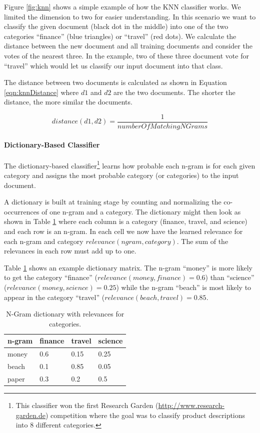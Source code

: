 \documentclass[a4paper,twoside]{book}      %
\begin{document}
Figure \ref{fig:knn} shows a simple example of how the KNN classifier works. We limited the dimension to two for easier understanding. In this scenario we want to classify the given document (black dot in the middle) into one of the two categories ``finance'' (blue triangles) or ``travel'' (red dots). We calculate the distance between the new document and all training documents and consider the votes of the nearest three. In the example, two of these three document vote for ``travel'' which would let us classify our input document into that class.

The distance between two documents is calculated as shown in Equation \ref{eqn:knnDistance} where $d1$ and $d2$ are the two documents. The shorter the distance, the more similar the documents.

\begin{equation}
\label{eqn:knnDistance}
distance(d1,d2) = \frac{1}{numberOfMatchingNGrams}
\end{equation}

\paragraph{Dictionary-Based Classifier}
The dictionary-based classifier\footnote{This classifier won the first Research Garden (\url{http://www.research-garden.de}) competition where the goal was to classify product descriptions into 8 different categories.} learns how probable each n-gram is for each given category and assigns the most probable category (or categories) to the input document.

A dictionary is built at training stage by counting and normalizing the co-occurrences of one n-gram and a category. The dictionary might then look as shown in Table \ref{tab:dictionary} where each column is a category (finance, travel, and science) and each row is an n-gram. In each cell we now have the learned relevance for each n-gram and category $relevance(ngram,category)$. The sum of the relevances in each row must add up to one.

Table \ref{tab:dictionary} shows an example dictionary matrix. The n-gram ``money'' is more likely to get the category ``finance'' ($relevance(money,finance) = 0.6$) than ``science'' ($relevance(money,science) = 0.25$) while the n-gram ``beach'' is most likely to appear in the category ``travel'' ($relevance(beach,travel) = 0.85$.

\begin{table}[ht]
\centering
\caption{N-Gram dictionary with relevances for categories.}
\begin{tabular}{|l|l|l|l|}
\hline
n-gram   & finance & travel & science \\
\hline
money	   & 0.6	&	0.15	&	0.25	\\
\hline
beach	& 0.1	&	0.85	&	0.05	\\
\hline
paper	   & 0.3 &	0.2	&	0.5	\\
\hline
\end{tabular} 
\label{tab:dictionary}
\end{table}
\end{document}
